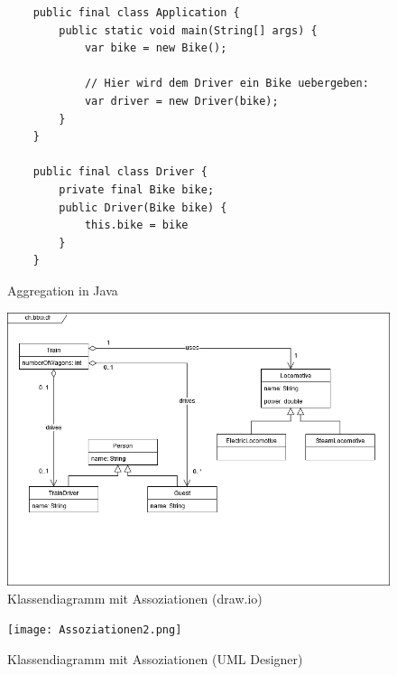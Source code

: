 \documentclass[a4paper, titlepage]{scrartcl}
\begin{document}
    \begin{figure}
    \begin{lstlisting}
    public final class Application {
        public static void main(String[] args) {
            var bike = new Bike();

            // Hier wird dem Driver ein Bike uebergeben:
            var driver = new Driver(bike);
        }
    }

    public final class Driver {
        private final Bike bike;
        public Driver(Bike bike) {
            this.bike = bike
        }        
    }
    \end{lstlisting}
    \caption{Aggregation in Java}
    \label{AggregationJava}
    \end{figure}

    \begin{figure}
        \includegraphics[width=\textwidth]{Assoziationen.png}
        \caption{Klassendiagramm mit Assoziationen (draw.io)}
        \label{AssoziationenDrawIO}
    \end{figure}
    \begin{figure}
        \texttt{[image: Assoziationen2.png]}
        \caption{Klassendiagramm mit Assoziationen (UML Designer)}
        \label{AssoziationenUmlDesigner}
    \end{figure}
\end{document}
